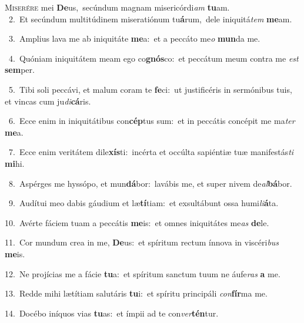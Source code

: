 \lettrine{\initial\textcolor{\initialcolor}{M}}{iserére} mei \textbf{De}\-us,~\star secúndum magnam misericórdi\textit{am} \textbf{tu}\-am.\\
{\numbfont\textcolor{\numbcolor}{~2.}}~Et secúndum multitúdinem miseratiónum tu\-\textbf{á}\-rum,~\star dele iniquitá\textit{tem} \textbf{me}\-am.\par
{\numbfont\textcolor{\numbcolor}{~3.}}~Amplius lava me ab iniquitáte \textbf{me}\-a:~\star et a peccáto me\textit{o} \textbf{mun}\-da me.\par
{\numbfont\textcolor{\numbcolor}{~4.}}~Quóniam iniquitátem meam ego co\-\textbf{gnós}\-co:~\star et peccátum meum contra me \textit{est} \textbf{sem}\-per.\par
{\numbfont\textcolor{\numbcolor}{~5.}}~Tibi soli peccávi, et malum coram te \textbf{fe}\-ci:~\star ut justificéris in sermónibus tuis, et vincas cum ju\-\textit{di}\-\textbf{cá}ris.\par
{\numbfont\textcolor{\numbcolor}{~6.}}~Ecce enim in iniquitátibus con\-\textbf{cép}\-tus sum:~\star et in peccátis concépit me ma\textit{ter} \textbf{me}\-a.\par
{\numbfont\textcolor{\numbcolor}{~7.}}~Ecce enim veritátem dile\-\textbf{xís}\-ti:~\star incérta et occúlta sapiéntiæ tuæ manifestás\textit{ti} \textbf{mi}\-hi.\par
{\numbfont\textcolor{\numbcolor}{~8.}}~Aspérges me hyssópo, et mun\-\textbf{dá}\-bor:~\star lavábis me, et super nivem de\-\textit{al}\-\textbf{bá}bor.\par
{\numbfont\textcolor{\numbcolor}{~9.}}~Audítui meo dabis gáudium et læ\-\textbf{tí}\-tiam:~\star et exsultábunt ossa humi\-\textit{li}\-\textbf{á}ta.\par
{\numbfont\textcolor{\numbcolor}{10.}}~Avérte fáciem tuam a peccátis \textbf{me}\-is:~\star et omnes iniquitátes me\textit{as} \textbf{de}\-le.\par
{\numbfont\textcolor{\numbcolor}{11.}}~Cor mundum crea in me, \textbf{De}\-us:~\star et spíritum rectum ínnova in viscéri\textit{bus} \textbf{me}\-is.\par
{\numbfont\textcolor{\numbcolor}{12.}}~Ne projícias me a fácie \textbf{tu}\-a:~\star et spíritum sanctum tuum ne áufe\textit{ras} \textbf{a} me.\par
{\numbfont\textcolor{\numbcolor}{13.}}~Redde mihi lætítiam salutáris \textbf{tu}\-i:~\star et spíritu principáli \textit{con}\-\textbf{fír}ma me.\par
{\numbfont\textcolor{\numbcolor}{14.}}~Docébo iníquos vias \textbf{tu}\-as:~\star et ímpii ad te con\-\textit{ver}\-\textbf{tén}tur.\par

